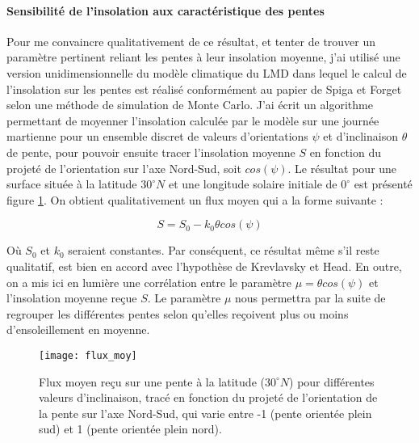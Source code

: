 \documentclass[11pt,a4paper]{article}
\begin{document}
\paragraph{Sensibilité de l'insolation aux caractéristique des pentes \\}
Pour me convaincre qualitativement de ce résultat, et tenter de trouver un paramètre pertinent reliant les pentes à leur insolation moyenne, j'ai utilisé une version unidimensionnelle du modèle climatique du LMD dans lequel le calcul de l'insolation sur les pentes est réalisé conformément au papier de Spiga et Forget \citep{Spig:08grl} selon une méthode de simulation de Monte Carlo. J'ai écrit un algorithme permettant de moyenner l'insolation calculée par le modèle sur une journée martienne pour un ensemble discret de valeurs d'orientations $\psi$ et d'inclinaison $\theta$ de pente, pour pouvoir ensuite tracer l'insolation moyenne $S$ en fonction du projeté de l'orientation sur l'axe Nord-Sud, soit $cos(\psi)$. Le résultat pour une surface située à la latitude $30^\circ N$ et une longitude solaire initiale de $0^\circ$ est présenté figure \ref{flux}. On obtient qualitativement un flux moyen qui a la forme suivante :

\begin{equation}
S = S_0 - k_0 \theta cos(\psi)
\end{equation}

Où $S_0$ et $k_0$ seraient constantes. Par conséquent, ce résultat même s'il reste qualitatif, est bien en accord avec l'hypothèse de Krevlavsky et Head. En outre, on a mis ici en lumière une corrélation entre le paramètre $\mu =  \theta cos(\psi)$ et l'insolation moyenne reçue $S$. Le paramètre $\mu$ nous permettra par la suite de regrouper les différentes pentes selon qu'elles reçoivent plus ou moins d'ensoleillement en moyenne.  \\

\begin{figure}[h!]
\begin{center}
\texttt{[image: flux\_moy]}
\caption{Flux moyen reçu sur une pente à la latitude ($30^\circ N$) pour différentes valeurs d'inclinaison, tracé en fonction du projeté de l'orientation de la pente sur l'axe Nord-Sud, qui varie entre -1 (pente orientée plein sud) et 1 (pente orientée plein nord). }
\label{flux}
\end{center}
\end{figure}
\end{document}
